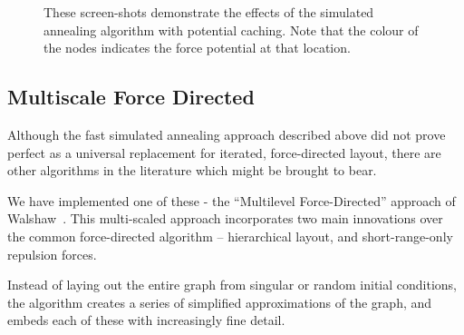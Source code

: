\documentclass[runningheads]{cl2emult}
\begin{document}
\begin{figure}[h]
  \centering
  \caption{These screen-shots demonstrate the effects of the simulated
  annealing algorithm with potential caching.  Note that the colour of
  the nodes indicates the force potential at that location.}
  \label{fig-fastlayout}
\end{figure}


\subsection{Multiscale Force Directed}

Although the fast simulated annealing approach described above did not prove
perfect as a universal replacement for iterated, force-directed layout, there
are other algorithms in the literature which might be brought to bear.

We have implemented one of these - the ``Multilevel Force-Directed'' approach
of Walshaw~\cite{walshaw00multilevel}.  This multi-scaled approach
incorporates two main innovations over the common force-directed
algorithm -- hierarchical layout, and short-range-only repulsion forces.

Instead of laying out the entire graph from singular or random initial
conditions, the algorithm creates a series of simplified approximations of
the graph, and embeds each of these with increasingly fine detail.
\end{document}

